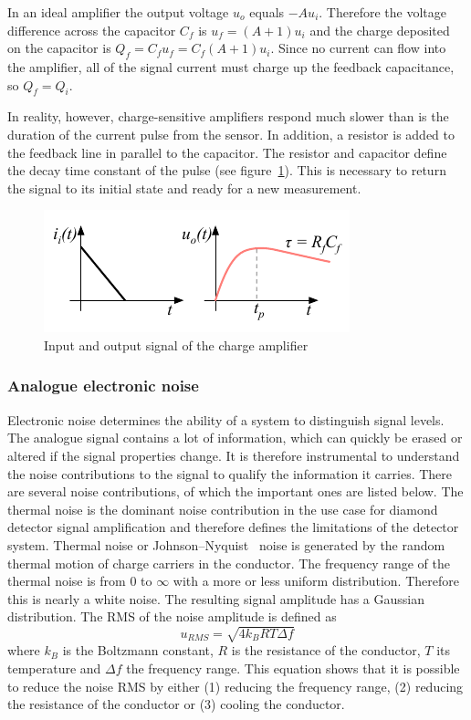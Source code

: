 \documentclass[twoside,12pt]{packages/mytustyle}  %
\begin{document}
In an ideal amplifier the output voltage $u_o$ equals $-Au_i$. Therefore the voltage difference across the capacitor $C_f$ is $u_f=(A+1)u_i$ and the charge deposited on the capacitor is $Q_f=C_f u_f = C_f (A+1)u_i$. Since no current can flow into the amplifier, all of the signal current must charge up the feedback capacitance, so $Q_f = Q_i$.

In reality, however, charge-sensitive amplifiers respond much slower than is the duration of the current pulse from the sensor. In addition, a resistor is added to the feedback line in parallel to the capacitor. The resistor and capacitor define the decay time constant of the pulse (see figure~\ref{fig:chgrc}). This is necessary to return the signal to its initial state and ready for a new measurement.
\begin{figure}[!t]
\begin{center}
\includegraphics[width=0.45\linewidth]{plots/chgrc}
\caption{Input and output signal of the charge amplifier}
\label{fig:chgrc}
\end{center}
\end{figure}

\subsubsection{Analogue electronic noise}
Electronic noise determines the ability of a system to distinguish signal levels. The analogue signal contains a lot of information, which can quickly be erased or altered if the signal properties change. It is therefore instrumental to understand the noise contributions to the signal to qualify the information it carries. There are several noise contributions, of which the important ones are listed below. The thermal noise is the dominant noise contribution in the use case for diamond detector signal amplification and therefore defines the limitations of the detector system. Thermal noise or Johnson--Nyquist~\cite{} noise is generated by the random thermal motion of charge carriers in the conductor. The frequency range of the thermal noise is from 0 to $\infty$ with a more or less uniform distribution. Therefore this is nearly a white noise. The resulting signal amplitude has a Gaussian distribution. The RMS of the noise amplitude is defined as
\begin{equation}
\label{eq:thermnoise}
u_{RMS}=\sqrt{4k_BRT\Delta f}
\end{equation}
where $k_B$ is the Boltzmann constant, $R$ is the resistance of the conductor, $T$ its temperature and $\Delta f$ the frequency range. This equation shows that it is possible to reduce the noise RMS by either (1) reducing the frequency range, (2) reducing the resistance of the conductor or (3) cooling the conductor. 
\end{document}
